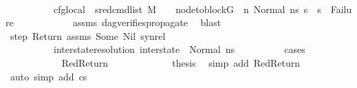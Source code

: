 \begin{isabellebody}
\ \isanewline
\ \ \ \ \ \ \ \ \ \ cfg{\isacharunderscore}{\kern0pt}local{\isacharcolon}{\kern0pt}\ {\isachardoublequoteopen}{\isacharparenleft}{\kern0pt}{\isasymAnd}\ s{}{\isacharprime}{\kern0pt}{\isachardot}{\kern0pt}{\isacharparenleft}{\kern0pt}{\isacharparenleft}{\kern0pt}red{\isacharunderscore}{\kern0pt}cmd{\isacharunderscore}{\kern0pt}list\ M\ {\isasymLambda}\ {\isasymGamma}\ {\isasymOmega}\ {\isacharparenleft}{\kern0pt}node{\isacharunderscore}{\kern0pt}to{\isacharunderscore}{\kern0pt}block{\isacharparenleft}{\kern0pt}G{\isacharparenright}{\kern0pt}\ {\isacharbang}{\kern0pt}\ n{\isacharparenright}{\kern0pt}\ {\isacharparenleft}{\kern0pt}Normal\ ns{}{\isacharparenright}{\kern0pt}\ s{}{\isacharprime}{\kern0pt}{\isacharparenright}{\kern0pt}\ {\isasymLongrightarrow}\ {\isacharparenleft}{\kern0pt}s{}{\isacharprime}{\kern0pt}\ {\isasymnoteq}\ Failure{\isacharparenright}{\kern0pt}{\isacharparenright}{\kern0pt}{\isacharparenright}{\kern0pt}{\isachardoublequoteclose}\isanewline
\ \ \ \ \ \ \ \ \ \ \isamarkupfalse%
\ assms{\isacharparenleft}{\kern0pt}{}{\isacharparenright}{\kern0pt}\ dag{\isacharunderscore}{\kern0pt}verifies{\isacharunderscore}{\kern0pt}propagate{\isacharunderscore}{\kern0pt}{}\ \isamarkupfalse%
\ blast\isanewline
\isanewline
\ \ \ \ \ \ \ \ \isamarkupfalse%
\ step{}\ Return\ assms{\isacharparenleft}{\kern0pt}{}{\isacharparenright}{\kern0pt}\ Some\ Nil\ syn{\isacharunderscore}{\kern0pt}rel\ \isamarkupfalse%
\isanewline
\ \ \ \ \ \ \ \ \ \ inter{\isacharunderscore}{\kern0pt}state{\isacharunderscore}{\kern0pt}resolution{\isacharcolon}{\kern0pt}\ {\isachardoublequoteopen}inter{\isacharunderscore}{\kern0pt}state\ {\isacharequal}{\kern0pt}\ Normal\ ns{}{\isachardoublequoteclose}\isanewline
\ \ \ \ \ \ \ \ \isamarkupfalse%
\ cases\isanewline
\ \ \ \ \ \ \ \ \ \ \isamarkupfalse%
\ RedReturn\ \isanewline
\ \ \ \ \ \ \ \ \ \ \isamarkupfalse%
\ {\isacharquery}{\kern0pt}thesis\ \isamarkupfalse%
\ {\isacharparenleft}{\kern0pt}simp\ add{\isacharcolon}{\kern0pt}\ RedReturn{\isacharparenright}{\kern0pt}\isanewline
\ \ \ \ \ \ \ \ \isamarkupfalse%
\ {\isacharparenleft}{\kern0pt}auto\ simp\ add{\isacharcolon}{\kern0pt}\ {\isacartoucheopen}cs{}\ {\isacharequal}{\kern0pt}\ {\isacharbrackleft}{\kern0pt}{\isacharbrackright}{\kern0pt}{\isacartoucheclose}{\isacharparenright}{\kern0pt}\ \ \ \ \ \ \ \ \ \ \ \ \isanewline

\end{isabellebody}
